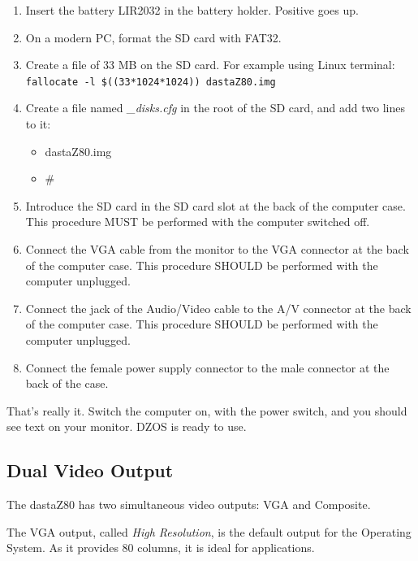 \documentclass[a4paper,11pt]{article}
\begin{document}
    \begin{enumerate}
        \item Insert the battery LIR2032 in the battery holder. Positive goes up.
        \item On a modern PC, format the SD card with FAT32.
        \item Create a file of 33 MB on the SD card. For example using Linux 
        terminal:  \texttt{fallocate -l \$((33*1024*1024)) dastaZ80.img}
        \item Create a file named \textit{\_disks.cfg} in the root of the SD card,
        and add two lines to it:
        \begin{itemize}
            \item dastaZ80.img
            \item \#
        \end{itemize}
        \item Introduce the SD card in the SD card slot at the back of the
        computer case. This procedure MUST be performed with the computer
        switched off.
        \item Connect the VGA cable from the monitor to the VGA connector at the
        back of the computer case. This procedure SHOULD be performed with the
        computer unplugged.
        \item Connect the jack of the Audio/Video cable to the A/V connector at
        the back of the computer case. This procedure SHOULD be performed with
        the computer unplugged.
        \item Connect the female power supply connector to the male connector at
        the back of the case.
    \end{enumerate}

    That’s really it. Switch the computer on, with the power switch, and you
    should see text on your monitor. DZOS is ready to use.

    \subsection{Dual Video Output}

    The dastaZ80 has two simultaneous video outputs: VGA and Composite.

    The VGA output, called \textit{High Resolution}, is the default output for
    the Operating System. As it provides 80 columns, it is ideal for
    applications.
\end{document}
